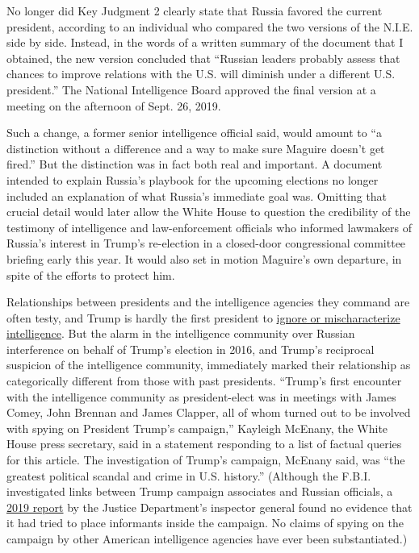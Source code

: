No longer did Key Judgment 2 clearly state that Russia favored the
current president, according to an individual who compared the two
versions of the N.I.E. side by side. Instead, in the words of a written
summary of the document that I obtained, the new version concluded that
``Russian leaders probably assess that chances to improve relations with
the U.S. will diminish under a different U.S. president.'' The National
Intelligence Board approved the final version at a meeting on the
afternoon of Sept. 26, 2019.

Such a change, a former senior intelligence official said, would amount
to ``a distinction without a difference and a way to make sure Maguire
doesn't get fired.'' But the distinction was in fact both real and
important. A document intended to explain Russia's playbook for the
upcoming elections no longer included an explanation of what Russia's
immediate goal was. Omitting that crucial detail would later allow the
White House to question the credibility of the testimony of intelligence
and law-enforcement officials who informed lawmakers of Russia's
interest in Trump's re-election in a closed-door congressional committee
briefing early this year. It would also set in motion Maguire's own
departure, in spite of the efforts to protect him.

Relationships between presidents and the intelligence agencies they
command are often testy, and Trump is hardly the first president to
\href{https://www.nytimes.com/2020/07/16/magazine/colin-powell-iraq-war.html}{ignore
or mischaracterize intelligence}. But the alarm in the intelligence
community over Russian interference on behalf of Trump's election in
2016, and Trump's reciprocal suspicion of the intelligence community,
immediately marked their relationship as categorically different from
those with past presidents. ``Trump's first encounter with the
intelligence community as president-elect was in meetings with James
Comey, John Brennan and James Clapper, all of whom turned out to be
involved with spying on President Trump's campaign,'' Kayleigh McEnany,
the White House press secretary, said in a statement responding to a
list of factual queries for this article. The investigation of Trump's
campaign, McEnany said, was ``the greatest political scandal and crime
in U.S. history.'' (Although the F.B.I. investigated links between Trump
campaign associates and Russian officials, a
\href{https://www.nytimes.com/2019/12/09/us/politics/fbi-ig-report-russia-investigation.html}{2019
report} by the Justice Department's inspector general found no evidence
that it had tried to place informants inside the campaign. No claims of
spying on the campaign by other American intelligence agencies have ever
been substantiated.)

